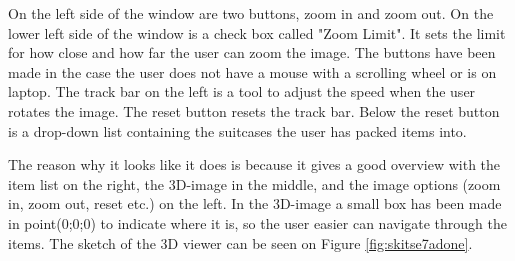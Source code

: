 On the left side of the window are two buttons, zoom in and zoom out. On the lower left side of the window is a check box called "Zoom Limit". It sets the limit for how close and how far the user can zoom the image. The buttons have been made in the case the user does not have a mouse with a scrolling wheel or is on laptop. The track bar on the left is a tool to adjust the speed when the user rotates the image. The reset button resets the track bar. Below the reset button is a drop-down list containing the suitcases the user has packed items into.

The reason why it looks like it does is because it gives a good overview with the item list on the right, the 3D-image in the middle, and the image options (zoom in, zoom out, reset etc.) on the left.
In the 3D-image a small box has been made in point(0;0;0) to indicate where it is, so the user easier can navigate through the items.
The sketch of the 3D viewer can be seen on Figure \ref{fig:skitse7adone}.
